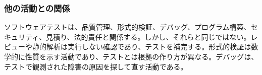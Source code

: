 \subsubsection{他の活動との関係}
ソフトウェアテストは、品質管理、形式的検証、デバッグ、プログラム構築、セキュリティ、見積り、法的責任と関係する。しかし、それらと同じではない。レビューや静的解析は実行しない確認であり、テストを補完する。形式的検証は数学的に性質を示す活動であり、テストとは根拠の作り方が異なる。デバッグは、テストで観測された障害の原因を探して直す活動である。
